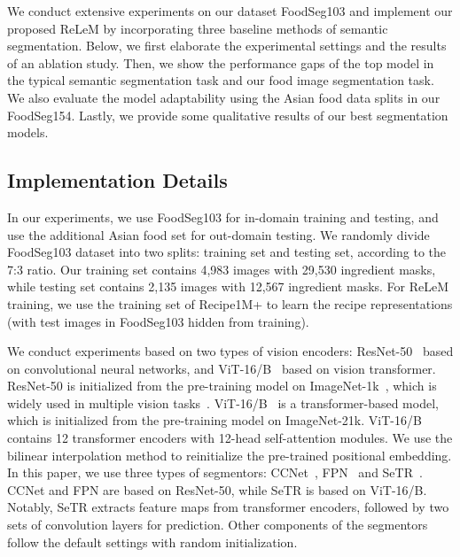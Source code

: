 
We conduct extensive experiments on our dataset FoodSeg103 and implement our proposed ReLeM by incorporating three baseline methods of semantic segmentation. 
Below, we first elaborate the experimental settings and the results of an ablation study.
Then, we show the performance gaps of the top model in the typical semantic segmentation task and our food image segmentation task.
We also evaluate the model adaptability using the Asian food data splits in our FoodSeg154.
Lastly, we provide some qualitative results of our best segmentation models.

\subsection{Implementation Details}
  In our experiments, we use FoodSeg103 for in-domain training and testing, and use the additional Asian food set for out-domain testing. We randomly divide FoodSeg103 dataset into two splits: training set and testing set,  according to the 7:3 ratio. Our training set contains 4,983 images with 29,530 ingredient masks, while testing set contains 2,135 images with 12,567 ingredient masks. For ReLeM training, we use the training set of Recipe1M+ to learn the recipe representations (with test images in FoodSeg103 hidden from training). 

 We conduct experiments based on two types of vision encoders: ResNet-50~\cite{he2016deep} based on convolutional neural networks, and ViT-16/B~\cite{dosovitskiy2021an} based on vision transformer. ResNet-50 is initialized from the pre-training model on ImageNet-1k~\cite{deng2009imagenet}, which is widely used in multiple vision tasks~\cite{krizhevsky2012imagenet,ren2015faster,chen2017deeplab}. ViT-16/B~\cite{dosovitskiy2021an} is a transformer-based model, which is initialized from the pre-training model on ImageNet-21k. ViT-16/B contains 12 transformer encoders with 12-head self-attention modules. We use the bilinear interpolation method to reinitialize the pre-trained positional embedding. In this paper, we use three types of segmentors: CCNet~\cite{huang2018ccnet}, FPN~\cite{kirillov2019panoptic} and SeTR~\cite{SETR}. CCNet and FPN are based on ResNet-50, while SeTR is based on ViT-16/B. 
Notably, SeTR extracts feature maps from  transformer encoders, followed by two sets of convolution layers for prediction. Other components of the segmentors follow the default settings with random initialization.

